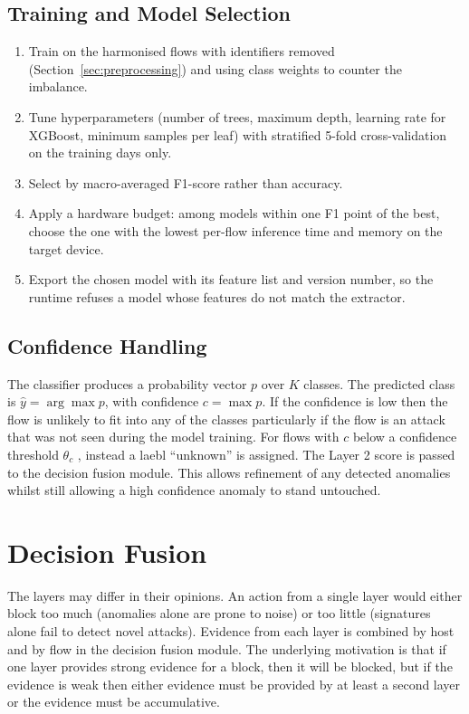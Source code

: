 \subsection{Training and Model Selection}\label{sec:5.6.3}
\label{sec:modelselection}
\begin{enumerate}
    \item Train on the harmonised flows with identifiers removed (Section~\ref{sec:preprocessing}) and using class weights to counter the imbalance.
    \item Tune hyperparameters (number of trees, maximum depth, learning rate for XGBoost, minimum samples per leaf) with stratified 5-fold cross-validation on the training days only.
    \item Select by macro-averaged F1-score rather than accuracy.
    \item Apply a hardware budget: among models within one F1 point of the best, choose the one with the lowest per-flow inference time and memory on the target device.
    \item Export the chosen model with its feature list and version number, so the runtime refuses a model whose features do not match the extractor.
\end{enumerate}

\subsection{Confidence Handling}\label{sec:5.6.4}
\label{sec:confidence}
\noindent The classifier produces a probability vector $p$ over $K$ classes. The predicted class is $\hat{y} = \arg\max p$, with confidence $c = \max p$. If the confidence is low then the flow is unlikely to fit into any of the classes particularly if the flow is an attack that was not seen during the model training. For flows with $c$ below a confidence threshold $\theta_c$ , instead a laebl ``unknown'' is assigned. The Layer 2 score is passed to the decision fusion module. This allows refinement of any detected anomalies whilst still allowing a high confidence anomaly to stand untouched.

\section{Decision Fusion}\label{sec:5.7}
\label{sec:fusion}
\noindent The layers may differ in their opinions. An action from a single layer would either block too much (anomalies alone are prone to noise) or too little (signatures alone fail to detect novel attacks). Evidence from each layer is combined by host and by flow in the decision fusion module. The underlying motivation is that if one layer provides strong evidence for a block, then it will be blocked, but if the evidence is weak then either evidence must be provided by at least a second layer or the evidence must be accumulative.

